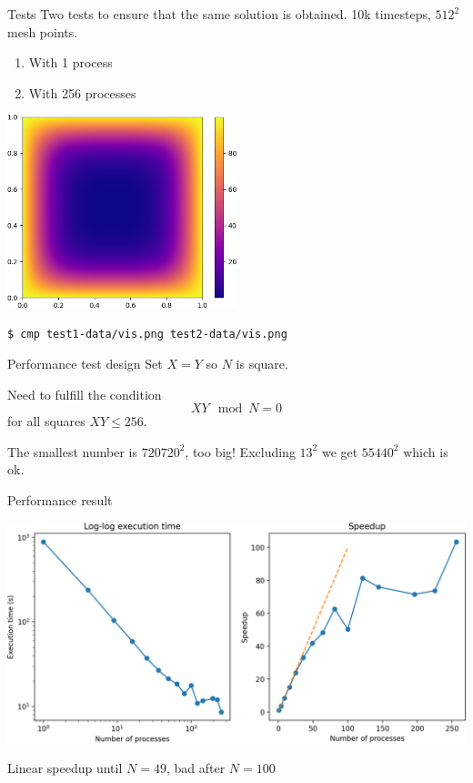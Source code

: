 \documentclass{beamer}
\begin{document}
\begin{frame}[fragile]{Tests}
    Two tests to ensure that the same solution is obtained. 10k timesteps,
    $512^2$ mesh points.
    \begin{enumerate}
        \item With 1 process
        \item With 256 processes
    \end{enumerate}
    \begin{center}
        \includegraphics[width=0.5\textwidth]{../test-vis.png}
    \end{center}
    \verb|$ cmp test1-data/vis.png test2-data/vis.png|
\end{frame}

\begin{frame}{Performance test design}
    Set $X=Y$ so $N$ is square.

    Need to fulfill the condition
    \[XY \mod N = 0\]
    for all squares $XY \leq 256$.

    The smallest number is $720720^2$, too big! Excluding
    $13^2$ we get $55440^2$ which is ok.
\end{frame}

\begin{frame}{Performance result}
    \begin{center}
        \includegraphics[width=\textwidth]{../perfplot.png}
    \end{center}
    Linear speedup until $N=49$, bad after $N=100$
\end{frame}
\end{document}
